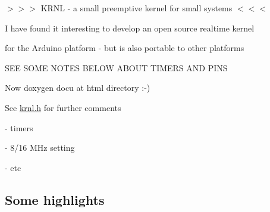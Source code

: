 $>$$>$$>$ K\+R\+N\+L -\/ a small preemptive kernel for small systems $<$$<$$<$

I have found it interesting to develop an open source realtime kernel

for the Arduino platform -\/ but is also portable to other platforms


\begin{DoxyItemize}
\item S\+E\+E S\+O\+M\+E N\+O\+T\+E\+S B\+E\+L\+O\+W A\+B\+O\+U\+T T\+I\+M\+E\+R\+S A\+N\+D P\+I\+N\+S
\item Now doxygen docu at html directory \+:-\/)
\item See \hyperlink{krnl_8h}{krnl.\+h} for further comments
\item -\/ timers
\item -\/ 8/16 M\+Hz setting
\item -\/ etc
\end{DoxyItemize}

\subsection*{Some highlights }


